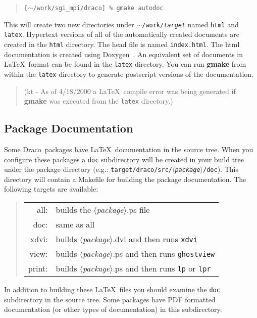 \documentclass[11pt]{nmemo}
\newcommand{\comp}[1]{\normalfont\footnotesize\texttt{#1}\normalsize}
\newcommand{\draco}{{\normalfont\sffamily Draco}}
\begin{document}
\footnotesize
\begin{verse}
\texttt{[$\sim$/work/sgi\_mpi/draco] \% gmake autodoc}
\end{verse}
\normalsize

This will create two new directories under
\comp{$\sim$/work/\emph{target}} named \comp{html} and \comp{latex}.
Hypertext versions of all of the automatically created documents are
created in the \comp{html} directory.  The head file is named
\comp{index.html}.  The html documentation is created using
Doxygen~\cite{doxygen}.  An equivalent set of documents in \LaTeX\ 
format can be found in the \comp{latex} directory.  You can run
\textbf{gmake} from within the \comp{latex} directory to generate
postscript versions of the documentation.  

\begin{verse}
(kt - As of 4/18/2000 a \LaTeX\ compile error was being generated if
\textbf{gmake} was executed from the \comp{latex} directory.)
\end{verse}

\subsection{Package Documentation}

Some \draco\ packages have \LaTeX\ documentation in the source tree.
When you configure these packages a \comp{doc} subdirectory will be
created in your build tree under the package directory (e.g.:
\comp{target/draco/src/$\langle$\emph{package}$\rangle$/doc}).  This directory will
contain a Makefile for building the package documentation.  The
following targets are available:

\begin{quote}
\begin{tabular}{rl}
all:    &  builds the $\langle$\emph{package}$\rangle$.ps file \\
doc:    &  same as all \\
xdvi:   &  builds $\langle$\emph{package}$\rangle$.dvi and then runs \comp{xdvi} \\
view:   &  builds $\langle$\emph{package}$\rangle$.ps and then runs \comp{ghostview} \\
print:  &  builds $\langle$\emph{package}$\rangle$.ps and then runs \comp{lp} or \comp{lpr}
\end{tabular}
\end{quote}

In addition to building these \LaTeX\ files you should examine the
\comp{doc} subdirectory in the source tree.  Some packages have PDF
formatted documentation (or other types of documentation) in this
subdirectory. 
\end{document}
